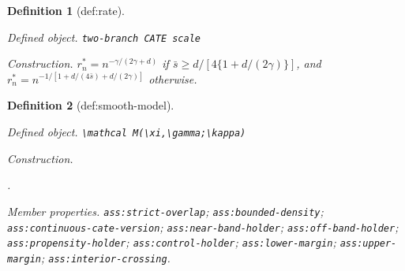 \documentclass{article}
\newtheorem{definition}{Definition}
\begin{document}
\begin{definition}[def:rate]\label{def:rate}
\par\smallskip\noindent\emph{Defined object.} \texttt{two-\allowbreak{}branch CATE scale}
\par\smallskip\noindent\emph{Construction.} \(r_n^*=n^{-\gamma/(2\gamma+d)}\) if \(\bar s\ge d/[4\{1+d/(2\gamma)\}]\), and \(r_n^*=n^{-1/[1+d/(4\bar s)+d/(2\gamma)]}\) otherwise.
\end{definition}

\begin{definition}[def:smooth-model]\label{def:smooth-model}
\par\smallskip\noindent\emph{Defined object.} \texttt{\textbackslash{}\allowbreak{}mathcal M(\textbackslash{}\allowbreak{}xi,\allowbreak{}\textbackslash{}\allowbreak{}gamma;\allowbreak{}\textbackslash{}\allowbreak{}kappa)}
\par\smallskip\noindent\emph{Construction.} \leavevmode\par\noindent {}\par\noindent.
\par\smallskip\noindent\emph{Member properties.} \texttt{ass:\allowbreak{}strict-\allowbreak{}overlap}; \texttt{ass:\allowbreak{}bounded-\allowbreak{}density}; \texttt{ass:\allowbreak{}continuous-\allowbreak{}cate-\allowbreak{}version}; \texttt{ass:\allowbreak{}near-\allowbreak{}band-\allowbreak{}holder}; \texttt{ass:\allowbreak{}off-\allowbreak{}band-\allowbreak{}holder}; \texttt{ass:\allowbreak{}propensity-\allowbreak{}holder}; \texttt{ass:\allowbreak{}control-\allowbreak{}holder}; \texttt{ass:\allowbreak{}lower-\allowbreak{}margin}; \texttt{ass:\allowbreak{}upper-\allowbreak{}margin}; \texttt{ass:\allowbreak{}interior-\allowbreak{}crossing}.
\end{definition}
\end{document}
